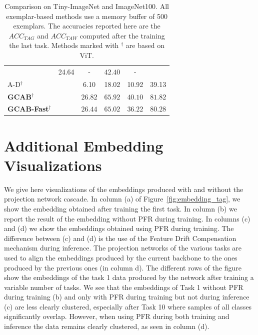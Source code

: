 \documentclass[twocolumn]{svjour3}          %
\newcommand{\cmark}{\ding{51}}%
\begin{document}
\begin{table}[tb]
\begin{tabular}{lccccc}
    &24.64 & - & $\mathbf{42.40}$ & - 
     \\
    A-D$^{\dag}$ \hfill \citep{pelosin2022towards}
     & \cmark & 6.10 & 18.02 & 10.92 & 39.13 \\
    \hline
    \textbf{GCAB}$^{\dag}$ & \cmark
    & $\mathbf{26.82 }$ & $\mathbf{65.92 }$& $40.10$ & $\mathbf{81.82}$
    \\
    \textbf{GCAB-Fast}$^{\dag}$& \cmark
    & ${26.44 }$ & ${65.02 }$&$36.22$ &$80.28$ 
    \\
    \hline
  \end{tabular}
\caption{Comparison on Tiny-ImageNet and ImageNet100. All exemplar-based methods use a memory buffer of 500 exemplars. The accuracies reported here are the $ACC_{TAG}$ and $ACC_{TAW}$ computed after the training the last task. Methods marked with $^{\dag}$ are based on ViT.} 
\label{tab:500_tiny}
\end{table}

\section{Additional Embedding Visualizations}
We give here visualizations of the embeddings produced with and without the projection network cascade. In column (a) of Figure~\ref{fig:embedding_tag}, we show the embedding obtained after training the first task. In column (b) we report the result of the embedding without PFR during training. In columns (c) and (d) we show the embeddings obtained using  PFR during training. The difference between (c) and (d) is the use of the Feature Drift Compensation mechanism during inference. The projection networks of the various tasks are used to align the embeddings produced by the current backbone to the ones produced by the previous ones (in column d). The different rows of the figure show the embeddings of the task 1 data produced by the network after training a variable number of tasks. 
We see that the embeddings of Task 1 without PFR during training (b) and only with PFR during training but not during inference (c) are less clearly clustered, especially after Task 10 where samples of all classes significantly overlap. However, when using PFR during both training and inference the data remains clearly clustered, as seen in column (d).
\end{document}
